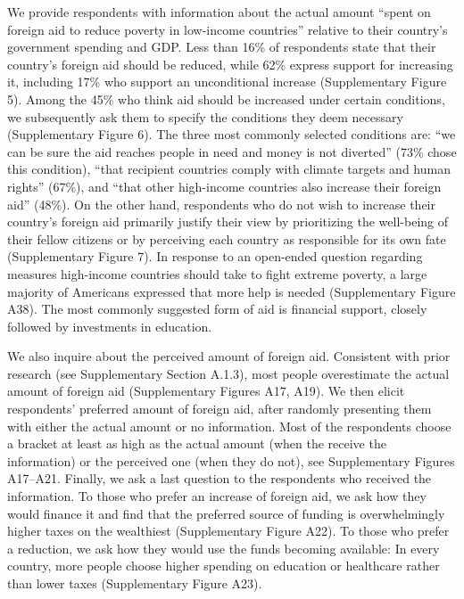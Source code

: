 We provide respondents with information about the actual amount ``spent on foreign aid to reduce poverty in low-income countries'' relative to their country's government spending and GDP. Less than 16\% of respondents state that their country's foreign aid should be reduced, while 62\% express support for increasing it, including 17\% who support an unconditional increase (Supplementary Figure 5). Among the 45\% who think aid should be increased under certain conditions, we subsequently ask them to specify the conditions they deem necessary (Supplementary Figure 6). The three most commonly selected conditions are: ``we can be sure the aid reaches people in need and money is not diverted'' (73\% chose this condition), ``that recipient countries comply with climate targets and human rights'' (67\%), and ``that other high-income countries also increase their foreign aid'' (48\%). %
On the other hand, respondents who do not wish to increase their country's foreign aid primarily justify their view by prioritizing the well-being of their fellow citizens or by perceiving each country as responsible for its own fate (Supplementary Figure 7). In response to an open-ended question regarding measures high-income countries should take to fight extreme poverty, a large majority of Americans expressed that more help is needed (Supplementary Figure A38). 
The most commonly suggested form of aid is financial support, closely followed by investments in education. %


We also inquire about the perceived amount of foreign aid. Consistent with prior research (see Supplementary Section A.1.3), most people overestimate the actual amount of foreign aid (Supplementary Figures A17, A19). 
We then elicit respondents' preferred amount of foreign aid, after randomly presenting them with either the actual amount or no information. Most of the respondents choose a bracket at least as high as the actual amount (when the receive the information) or the perceived one (when they do not), %
see Supplementary Figures A17--A21. 
Finally, we ask a last question to the respondents who received the information. To those who prefer an increase of foreign aid, we ask how they would finance it and find that the preferred source of funding is overwhelmingly higher taxes on the wealthiest (Supplementary Figure A22). 
To those who prefer a reduction, we ask how they would use the funds becoming available: %
In every country, more people choose higher spending on education or healthcare rather than lower taxes (Supplementary Figure A23). %



